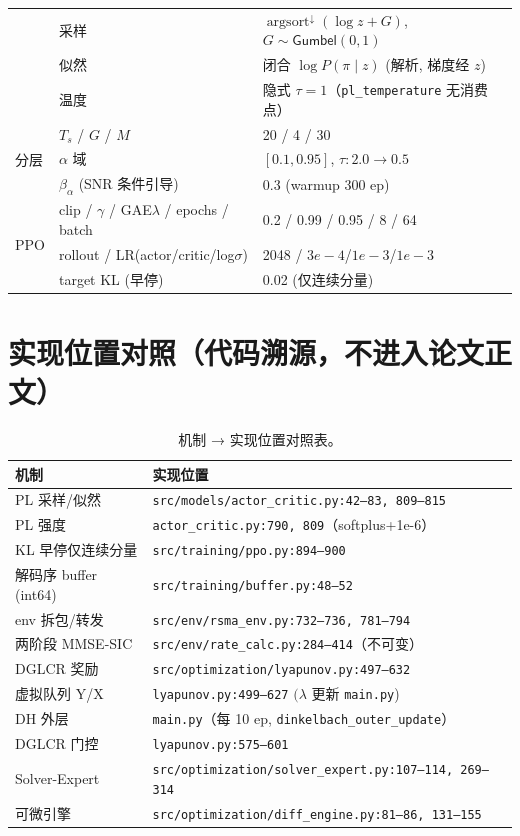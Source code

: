 \documentclass[UTF8,11pt,a4paper]{ctexart}
\theoremstyle{plain}
\theoremstyle{definition}
\theoremstyle{remark}
\begin{document}
\begin{table}[ht]
\begin{tabular}{@{}lll@{}}
 & 采样 & $\operatorname{argsort}^{\downarrow}(\log z + G)$, $G\sim\mathsf{Gumbel}(0,1)$\\
 & 似然 & 闭合 $\log P(\pi\mid z)$ (解析, 梯度经 $z$)\\
 & 温度 & 隐式 $\tau{=}1$（\texttt{pl\_temperature} 无消费点）\\
\midrule
\multirow{3}{*}{分层} & $T_s$ / $G$ / $M$ & 20 / 4 / 30\\
 & $\alpha$ 域 & $[0.1,0.95]$, $\tau:2.0{\to}0.5$\\
 & $\beta_{\alpha}$ (SNR 条件引导) & 0.3 (warmup 300 ep)\\
\midrule
\multirow{3}{*}{PPO} & clip / $\gamma$ / GAE$\lambda$ / epochs / batch & 0.2 / 0.99 / 0.95 / 8 / 64\\
 & rollout / LR(actor/critic/log$\sigma$) & 2048 / $3e{-}4$/$1e{-}3$/$1e{-}3$\\
 & target KL (早停) & 0.02 (仅连续分量)\\
\bottomrule
\end{tabular}
\end{table}

\section{实现位置对照（代码溯源，不进入论文正文）} \label{sec:code-map}

\begin{table}[ht]
\centering
\caption{机制 → 实现位置对照表。}
\label{tab:code}
\begin{tabular}{@{}ll@{}}
\toprule
机制 & 实现位置\\
\midrule
PL 采样/似然 & \texttt{src/models/actor\_critic.py:42--83, 809--815}\\
PL 强度 & \texttt{actor\_critic.py:790, 809}（softplus+1e-6）\\
KL 早停仅连续分量 & \texttt{src/training/ppo.py:894--900}\\
解码序 buffer (int64) & \texttt{src/training/buffer.py:48--52}\\
env 拆包/转发 & \texttt{src/env/rsma\_env.py:732--736, 781--794}\\
两阶段 MMSE-SIC & \texttt{src/env/rate\_calc.py:284--414}（不可变）\\
DGLCR 奖励 & \texttt{src/optimization/lyapunov.py:497--632}\\
虚拟队列 Y/X & \texttt{lyapunov.py:499--627} \((\lambda\) 更新 \texttt{main.py})\\
DH 外层 & \texttt{main.py}（每 10 ep, \texttt{dinkelbach\_outer\_update}）\\
DGLCR 门控 & \texttt{lyapunov.py:575--601}\\
Solver-Expert & \texttt{src/optimization/solver\_expert.py:107--114, 269--314}\\
可微引擎 & \texttt{src/optimization/diff\_engine.py:81--86, 131--155}\\
\bottomrule
\end{tabular}
\end{table}
\end{document}
